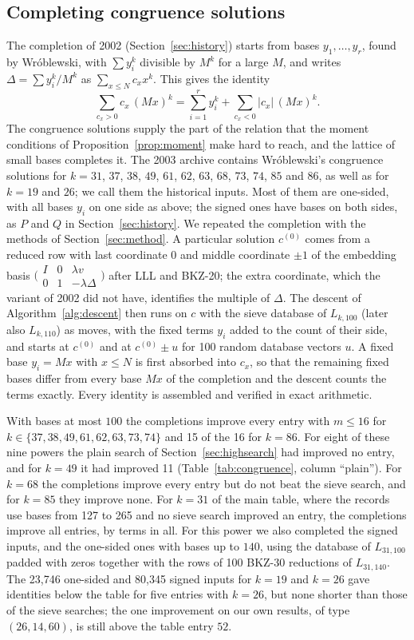 \documentclass[11pt]{amsart}
\theoremstyle{definition}
\theoremstyle{remark}
\begin{document}
\subsection{Completing congruence solutions}\label{sec:completion}
The completion of 2002 (Section~\ref{sec:history}) starts from bases $y_1,\dots,y_r$, found by
Wr\'oblewski, with $\sum y_i^k$ divisible by $M^k$ for a large $M$, and writes
$\Delta=\sum y_i^k/M^k$ as $\sum_{x\le N}c_x x^k$. This gives the identity
\[
\sum_{c_x>0}c_x\,(Mx)^k=\sum_{i=1}^{r}y_i^k+\sum_{c_x<0}|c_x|\,(Mx)^k .
\]
The congruence solutions supply the part of the relation that the moment conditions of
Proposition~\ref{prop:moment} make hard to reach, and the lattice of small bases completes it.
The 2003 archive contains Wr\'oblewski's congruence solutions for
$k=31$, $37$, $38$, $49$, $61$, $62$, $63$, $68$, $73$, $74$, $85$ and $86$, as well as for
$k=19$ and $26$; we call them the historical inputs. Most of them are one-sided, with all bases
$y_i$ on one side as above;
the signed ones have bases on both sides, as $P$ and $Q$ in Section~\ref{sec:history}. We
repeated the completion with the methods of Section~\ref{sec:method}. A particular solution
$c^{(0)}$ comes from a reduced row with last coordinate $0$ and middle coordinate $\pm1$ of the
embedding basis
$\bigl(\begin{smallmatrix}I&0&\lambda v\\0&1&-\lambda\Delta\end{smallmatrix}\bigr)$ after LLL and
BKZ-20; the extra coordinate, which the variant of 2002 did not have, identifies the multiple of
$\Delta$. The descent of Algorithm~\ref{alg:descent} then runs on $c$ with the sieve database of
$L_{k,100}$ (later also $L_{k,110}$) as moves, with the fixed terms $y_i$ added to the count of
their side, and starts at $c^{(0)}$ and at $c^{(0)}\pm u$ for 100 random database vectors $u$. A
fixed base $y_i=Mx$ with $x\le N$ is first absorbed into $c_x$, so that the remaining fixed bases
differ from every base $Mx$ of the completion and the descent counts the terms exactly. Every
identity is assembled and verified in exact arithmetic.

With bases at most $100$ the completions improve every entry with $m\le16$ for
$k\in\{37,38,49,61,62,63,73,74\}$ and 15 of the 16 for $k=86$. For eight of these
nine powers the plain search of Section~\ref{sec:highsearch} had improved no entry, and for
$k=49$ it had improved 11 (Table~\ref{tab:congruence}, column ``plain''). For $k=68$ the completions
improve every entry but do not beat the sieve search, and for $k=85$ they improve none. For
$k=31$ of the main table, where the records use bases from 127 to 265 and no sieve search
improved an entry, the completions improve all \KThirtyOneImproved{} entries, by
\KThirtyOneSaved{} terms in all. For this power we also completed the signed inputs, and the
one-sided ones with bases up to $140$, using the database of $L_{31,100}$ padded with zeros
together with the rows of 100 BKZ-30 reductions of $L_{31,140}$. The 23{,}746 one-sided and 80{,}345 signed inputs for $k=19$ and $k=26$ gave
identities below the table for five entries with $k=26$, but none shorter than those of the
sieve searches; the one improvement on our own results, of type
$(26,14,60)$, is still above the table entry $52$.
\end{document}

